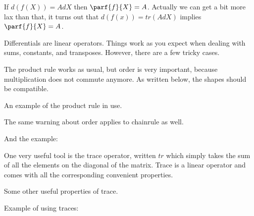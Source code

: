 \documentclass[12pt]{article}
\begin{document}
If $d(f(X)) = AdX$ then $\parf{f}{X} = A$. Actually we can get a bit more lax than that, it turns out that $d(f(x)) = tr(AdX)$ implies $\parf{f}{X} = A$. 

Differentials are linear operators. Things work as you expect when dealing with sums, constants, and transposes. However, there are a few tricky cases.

The product rule works as usual, but order is very important, because multiplication does not commute anymore. As written below, the shapes should be compatible. 

An example of the product rule in use.


The same warning about order applies to chainrule as well.

And the example:


One very useful tool is the trace operator, written $tr$ which simply takes the sum of all the elements on the diagonal of the matrix. Trace is a linear operator and comes with all the corresponding convenient properties. 

Some other useful properties of trace.


Example of using traces:

\end{document}
